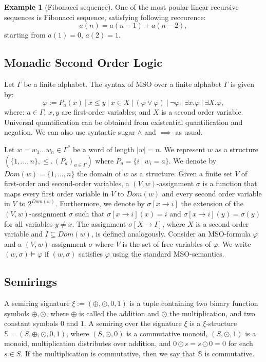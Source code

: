 \documentclass[12pt]{article}
\theoremstyle{definition}
\newtheorem{example}{Example}[section]
\begin{document}
\begin{example}[Fibonacci sequence]
    One of the most poular linear recursive sequences is Fibonacci sequence, satisfying following reccurence:
    $$a(n) = a(n-1) + a(n-2),$$
    starting from $a(1) = 0$, $a(2) = 1$.
\end{example}

\subsection{Monadic Second Order Logic}

Let $\Gamma$ be a finite alphabet. The syntax of MSO over a finite alphabet $\Gamma$ is given by:
$$ \varphi := P_a(x) \ | \ x \leq y \ | \ x \in X \ | \ (\varphi \lor \varphi) \ | \ \neg \varphi \ | \ \exists x. \varphi \ | \ \exists X . \varphi, $$
where: $a \in \Gamma$; $x, y$ are first-order variables; and $X$ is a second order variable. Universal quantification can be obtained from existential quantification and negation. We can also use syntactic sugar $\land$ and $\implies$ as usual.

Let $w = w_1\ldots w_n \in \Gamma^*$ be a word of length $|w| = n$. We represent $w$ as a structure $(\{1,\ldots,n\}, \leq, (P_a)_{a \in \Gamma})$ where $P_a = \{i \ | \ w_i = a\}$. We denote by $Dom(w) = \{1,\ldots,n\}$ the domain of $w$ as a structure. Given a finite set $V$ of first-order and second-order variables, a $(V,w)$-assignment $\sigma$ is a function that maps every first order variable in $V$ to $Dom(w)$ and every second order variable in $V$ to $2^{Dom(w)}$. Furthermore, we denote by $\sigma[x \rightarrow i]$ the extension of the $(V,w)$-assignment $\sigma$ such that $\sigma[x \rightarrow i](x) = i$ and $\sigma[x \rightarrow i](y) = \sigma(y)$ for all variables $y \ne x$. The assignment $\sigma[X \rightarrow I]$, where $X$ is a second-order variable and $I \subseteq Dom(w)$, is defined analogously. Consider an MSO-formula $\varphi$ and a $(V,w)$-assignment $\sigma$ where $V$ is the set of free variables of $\varphi$. We write $(w, \sigma) \models \varphi$ if $(w, \sigma)$ satisfies $\varphi$ using the standard MSO-semantics.

\subsection{Semirings}

A semiring signature $\xi := (\oplus, \odot, 0, 1)$ is a tuple containing two binary function symbols $\oplus, \odot$, where $\oplus$ is called the addition and $\odot$ the multiplication, and two constant symbols $0$ and $1$. A semiring over the signature $\xi$ is a $\xi$-structure $\mathbb{S} = (S, \oplus, \odot, 0, 1)$, where $(S, \odot, 0)$ is a commutative monoid, $(S, \odot, 1)$ is a monoid, multiplication distributes over addition, and $0 \odot s = s \odot 0 = 0$ for each $s \in S$. If the multiplication is commutative, then we say that $\mathbb{S}$ is commutative.
\end{document}
